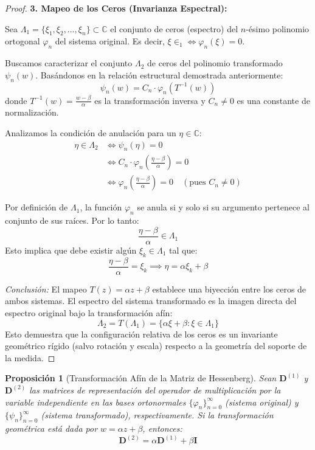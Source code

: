 \documentclass[12pt,a4paper]{article}
\newtheorem{proposicion}[teorema]{Proposición}
\newcommand{\C}{\mathbb{C}}
\begin{document}
\begin{proof}
\textbf{3. Mapeo de los Ceros (Invarianza Espectral):}

Sea $\Lambda_1 = \{\xi_1, \xi_2, \dots, \xi_n\} \subset \C$ el conjunto de ceros (espectro) del $n$-ésimo polinomio ortogonal $\varphi_n$ del sistema original. Es decir, $\xi \in _1 \iff \varphi_n(\xi) = 0$.

Buscamos caracterizar el conjunto $\Lambda_2$ de ceros del polinomio transformado $\psi_n(w)$. Basándonos en la relación estructural demostrada anteriormente:
$$ \psi_n(w) = C_n \cdot \varphi_n\left( T^{-1}(w) \right) $$
donde $T^{-1}(w) = \frac{w - \beta}{\alpha}$ es la transformación inversa y $C_n \neq 0$ es una constante de normalización.

Analizamos la condición de anulación para un $\eta \in \C$:
\begin{align*}
    \eta \in \Lambda_2 &\iff \psi_n(\eta) = 0 \\
    &\iff C_n \cdot \varphi_n\left( \frac{\eta - \beta}{\alpha} \right) = 0 \\
    &\iff \varphi_n\left( \frac{\eta - \beta}{\alpha} \right) = 0 \quad (\text{pues } C_n \neq 0)
\end{align*}

Por definición de $\Lambda_1$, la función $\varphi_n$ se anula si y solo si su argumento pertenece al conjunto de sus raíces. Por lo tanto:
$$ \frac{\eta - \beta}{\alpha} \in \Lambda_1 $$
Esto implica que debe existir algún $\xi_k \in \Lambda_1$ tal que:
$$ \frac{\eta - \beta}{\alpha} = \xi_k \implies \eta = \alpha \xi_k + \beta $$

\textit{Conclusión:} El mapeo $T(z) = \alpha z + \beta$ establece una biyección entre los ceros de ambos sistemas. El espectro del sistema transformado es la imagen directa del espectro original bajo la transformación afín:
$$ \Lambda_2 = T(\Lambda_1) = \{ \alpha \xi + \beta : \xi \in \Lambda_1 \} $$
Esto demuestra que la configuración relativa de los ceros es un invariante geométrico rígido (salvo rotación y escala) respecto a la geometría del soporte de la medida.
\end{proof}

\begin{proposicion}[Transformación Afín de la Matriz de Hessenberg]
Sean $\mathbf{D}^{(1)}$ y $\mathbf{D}^{(2)}$ las matrices de representación del operador de multiplicación por la variable independiente en las bases ortonormales $\{\varphi_n\}_{n=0}^\infty$ (sistema original) y $\{\psi_n\}_{n=0}^\infty$ (sistema transformado), respectivamente. Si la transformación geométrica está dada por $w = \alpha z + \beta$, entonces:
\begin{equation}
    \mathbf{D}^{(2)} = \alpha \mathbf{D}^{(1)} + \beta \mathbf{I}
\end{equation}
\end{proposicion}
\end{document}
